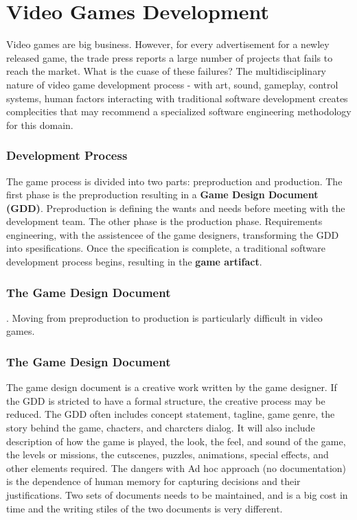   \section*{Video Games Development}
  Video games are big business. However, for every advertisement for a newley released game, the trade press reports a large number of projects that fails to reach the market. What is the cuase of these failures? The multidisciplinary nature of video game development process -  with art, sound, gameplay, control systems, human factors interacting with traditional software development creates complecities that may recommend a specialized software engineering methodology for this domain. 

    \subsubsection*{Development Process}
    The game process is divided into two parts: preproduction and production. The first phase is the preproduction resulting in a {\bf Game Design Document (GDD)}. Preproduction is defining the wants and needs before meeting with the development team. The other phase is the production phase. Requirements engineering, with the assistencee of the game designers, transforming the GDD into spesifications. Once the specification is complete, a traditional software development process begins, resulting in the {\bf game artifact}.
    \subsubsection*{The Game Design Document}. Moving from preproduction to production is particularly difficult in video games.

    \subsubsection*{The Game Design Document}
    The game design document is a creative work written by the game designer. If the GDD is stricted to have a formal structure, the creative process may be reduced. The GDD often includes concept statement, tagline, game genre, the story behind the game, chacters, and charcters dialog. It will also include description of how the game is played, the look, the feel, and sound of the game, the levels or missions, the cutscenes, puzzles, animations, special effects, and other elements required. The dangers with Ad hoc approach (no documentation) is the dependence of human memory for capturing decisions and their justifications. Two sets of documents needs to be maintained, and is a big cost in time and the writing stiles of the two documents is very different.  

